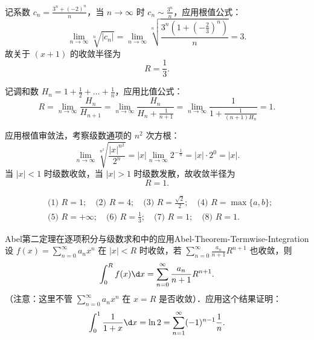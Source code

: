 \begin{solution}

    记系数 $c_n = \frac{3^n + (-2)^n}{n}$，当 $n \to \infty$ 时 $c_n \sim \frac{3^n}{n}$，应用根值公式：
    \begin{equation}
        \lim_{n\to\infty} \sqrt[n]{|c_n|} = \lim_{n\to\infty} \sqrt[n]{\frac{3^n\left(1 + \left(-\frac{2}{3}\right)^n\right)}{n}} = 3.
    \end{equation}
    故关于 $(x+1)$ 的收敛半径为
    \begin{equation}
        R = \frac{1}{3}.
    \end{equation}


    记调和数 $H_n = 1 + \frac{1}{2} + \dots + \frac{1}{n}$，应用比值公式：
    \begin{equation}
        R = \lim_{n\to\infty} \frac{H_n}{H_{n+1}} = \lim_{n\to\infty} \frac{H_n}{H_n + \frac{1}{n+1}} = \lim_{n\to\infty} \frac{1}{1 + \frac{1}{(n+1)H_n}} = 1.
    \end{equation}


    应用根值审敛法，考察级数通项的 $n^2$ 次方根：
    \begin{equation}
        \lim_{n\to\infty} \sqrt[n^2]{\frac{|x|^{n^2}}{2^n}} = |x| \lim_{n\to\infty} 2^{-\frac{1}{n}} = |x| \cdot 2^0 = |x|.
    \end{equation}
    当 $|x| < 1$ 时级数收敛，当 $|x| > 1$ 时级数发散，故收敛半径为
    \begin{equation}
        R = 1.
    \end{equation}

    \begin{equation}
        \boxed{
            \begin{aligned}
                 & \text{(1) } R = 1; \quad \text{(2) } R = 4; \quad \text{(3) } R = \frac{\sqrt{2}}{2}; \quad \text{(4) } R = \max\{a, b\}; \\
                 & \text{(5) } R = +\infty; \quad \text{(6) } R = \frac{1}{3}; \quad \text{(7) } R = 1; \quad \text{(8) } R = 1.
            \end{aligned}
        }
    \end{equation}
\end{solution}

\begin{problem}{Abel第二定理在逐项积分与级数求和中的应用}{Abel-Theorem-Termwise-Integration}
    设 $f(x) = \sum_{n=0}^\infty a_n x^n$ 在 $|x| < R$ 时收敛，若 $\sum_{n=0}^\infty \frac{a_n}{n+1} R^{n+1}$ 也收敛，则
    \begin{equation}
        \int_0^R f(x)\d x = \sum_{n=0}^\infty \frac{a_n}{n+1} R^{n+1}.
    \end{equation}
    （注意：这里不管 $\sum_{n=0}^\infty a_n x^n$ 在 $x = R$ 是否收敛）．应用这个结果证明：
    \begin{equation}
        \int_0^1 \frac{1}{1+x}\d x = \ln 2 = \sum_{n=1}^\infty (-1)^{n-1}\frac{1}{n}.
    \end{equation}
\end{problem}

